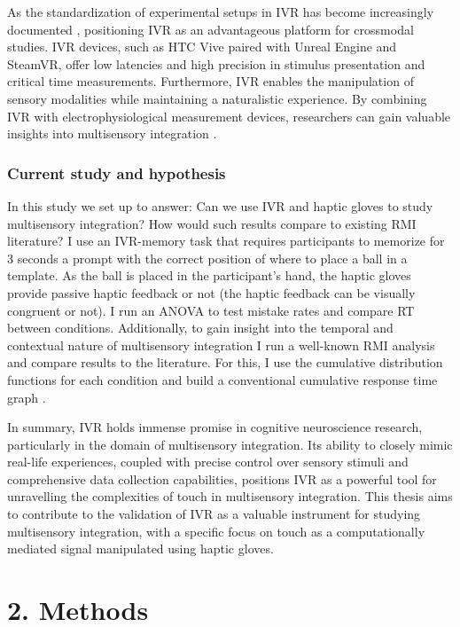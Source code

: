 \documentclass[12pt,oneside,openright]{report}
\begin{document}
As the standardization of experimental setups in IVR has become increasingly documented \parencite{Vasser2020GuidelinesFI,deGelder2018VirtualRA, Schne2023TheRO,vr_respont}, positioning IVR as an advantageous platform for crossmodal studies. IVR devices, such as HTC Vive paired with Unreal Engine and SteamVR, offer low latencies and high precision in stimulus presentation and critical time measurements. Furthermore, IVR enables the manipulation of sensory modalities while maintaining a naturalistic experience. By combining IVR with electrophysiological measurement devices, researchers can gain valuable insights into multisensory integration \parencite{Vasser2020GuidelinesFI}.

\subsubsection*{Current study and hypothesis}

In this study we set up to answer: Can we use IVR and haptic gloves to study multisensory integration? How would such results compare to existing RMI literature? I use an IVR-memory task that requires participants to memorize for 3 seconds a prompt with the correct position of where to place a ball in a template. As the ball is placed in the participant's hand, the haptic gloves provide passive haptic feedback or not (the haptic feedback can be visually congruent or not). I run an ANOVA to test mistake rates and compare RT between conditions. Additionally, to gain insight into the temporal and contextual nature of multisensory integration I run a well-known RMI analysis and compare results to the literature. For this, I use the cumulative distribution functions for each condition and build a conventional cumulative response time graph \parencite{MILLER1982247}. 

In summary, IVR holds immense promise in cognitive neuroscience research, particularly in the domain of multisensory integration. Its ability to closely mimic real-life experiences, coupled with precise control over sensory stimuli and comprehensive data collection capabilities, positions IVR as a powerful tool for unravelling the complexities of touch in multisensory integration. This thesis aims to contribute to the validation of IVR as a valuable instrument for studying multisensory integration, with a specific focus on touch as a computationally mediated signal manipulated using haptic gloves.

\section*{2. Methods}
\end{document}

